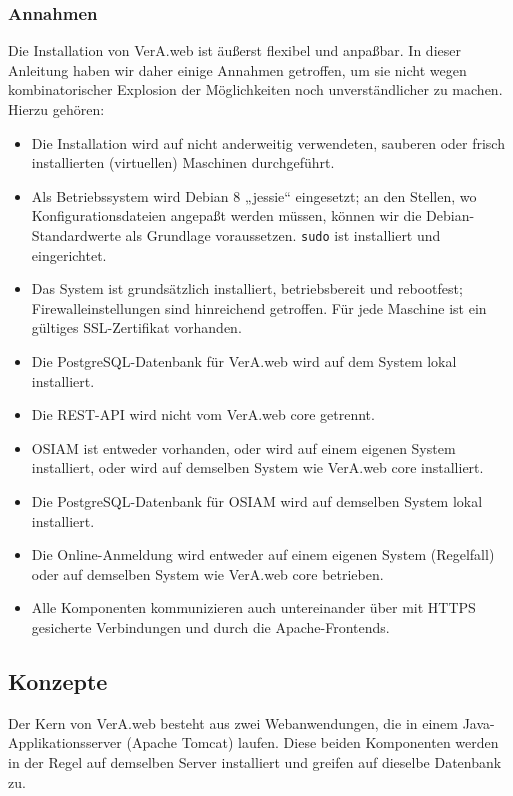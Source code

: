 \subsubsection{Annahmen}\label{subsubsec:aboutmanual-assume}

Die Installation von VerA.web ist äußerst flexibel und anpaßbar.
In dieser Anleitung haben wir daher einige Annahmen getroffen, um
sie nicht wegen kombinatorischer Explosion der Möglichkeiten noch
unverständlicher zu machen. Hierzu gehören:\keinumbruch

\begin{itemize}
 \item{Die Installation wird auf nicht anderweitig verwendeten,
  sauberen oder frisch installierten (virtuellen) Maschinen durchgeführt.}
 \item{Als Betriebssystem wird Debian 8 „jessie“
  eingesetzt; an den Stellen, wo Konfigurationsdateien
  angepaßt werden müssen, können wir die Debian-Standardwerte
  als Grundlage voraussetzen. \texttt{sudo} ist installiert
  und eingerichtet.}
 \item{Das System ist grundsätzlich installiert, betriebsbereit
  und rebootfest; Firewalleinstellungen sind hinreichend getroffen.
  Für jede Maschine ist ein gültiges SSL-Zertifikat vorhanden.}
 \item{Die PostgreSQL-Datenbank für VerA.web wird auf dem System
  lokal installiert.}
 \item{Die REST-API wird nicht vom VerA.web core getrennt.}
\ifoa
 \item{OSIAM ist entweder vorhanden, oder wird auf einem eigenen
  System installiert, oder wird auf demselben System wie VerA.web
  core installiert.}
 \item{Die PostgreSQL-Datenbank für OSIAM wird auf demselben
  System lokal installiert.}
 \item{Die Online-Anmeldung wird entweder auf einem eigenen System
  (Regelfall) oder auf demselben System wie VerA.web core betrieben.}
 \item{Alle Komponenten kommunizieren auch untereinander über mit
  HTTPS gesicherte Verbindungen und durch die Apache-Frontends.}
\fi%
\end{itemize}

\subsection{Konzepte}\label{subsec:concepts}

Der Kern von VerA.web besteht aus zwei Webanwendungen, die in einem
Java-Applikationsserver (Apache Tomcat) laufen. Diese beiden Komponenten
werden in der Regel auf demselben Server installiert und greifen auf
dieselbe Datenbank zu.


